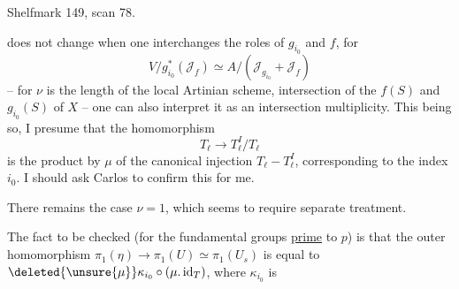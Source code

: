 Shelfmark 149, scan 78.

does not change when one interchanges the roles of $g_{i_0}$ and $f$, for
\[
V/g_{i_0}^*(\mathcal J_f)\simeq A/(\mathcal J_{g_{i_0}}+\mathcal J_f)
\]
-- for $\nu$ is the length of the local Artinian scheme, intersection of the  $f(S)$ and $g_{i_0}(S)$ of $X$ -- one can also interpret it as an intersection multiplicity. This being so, I presume that the homomorphism
\[
T_\ell\longrightarrow T_\ell^I/T_\ell
\]
is the product by $\mu$ of the canonical injection $T_\ell-T_\ell^I$, corresponding to the index $i_0$. I should ask Carlos to confirm this for me.

There remains the case $\nu=1$, which seems to require separate treatment.

The fact to be checked (for the fundamental groups \uline{prime} to $p$) is that the outer homomorphism $\pi_1(\eta)\longrightarrow\pi_1(U)\simeq\pi_1(U_s)$ is equal to $\deleted{\unsure{\mu}}\kappa_{i_0}\circ(\mu.\operatorname{id}_T)$, where $\kappa_{i_0}$ is
